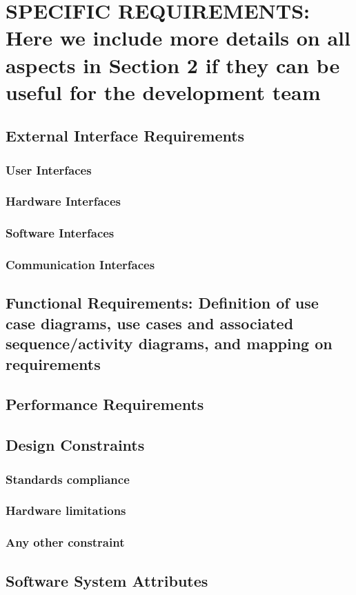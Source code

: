 \documentclass[12pt,a4paper]{article}
\begin{document}
\section{SPECIFIC REQUIREMENTS: Here we include more details on all aspects in Section 2 if they 
can be useful for the development team}
\subsection{External Interface Requirements} 
\subsubsection{User Interfaces}
\subsubsection{Hardware Interfaces}
\subsubsection{Software Interfaces}
\subsubsection{Communication Interfaces}
\subsection{Functional  Requirements:  Definition  of  use  case  diagrams,  use  cases  and  associated 
sequence/activity diagrams, and mapping on requirements} 
\subsection{Performance Requirements} 
\subsection{Design Constraints}
\subsubsection{Standards compliance}
\subsubsection{Hardware limitations}
\subsubsection{Any other constraint} 
\subsection{Software System Attributes} 
\end{document}
